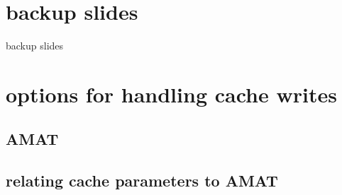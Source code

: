 \section{backup slides}
\begin{frame}{backup slides}
\end{frame}
\section{options for handling cache writes}


\subsection{AMAT}




\subsection{relating cache parameters to AMAT}



